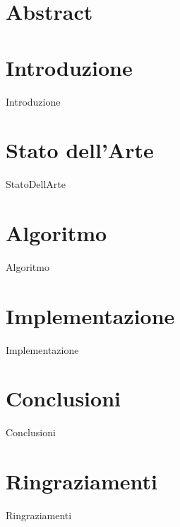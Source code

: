 \documentclass[12pt  m,oneside]{report}
\begin{document}
 
	                
	\begin{titlepage}
		
	\end{titlepage} 
    
    
	\chapter*{Abstract}
	
    \tableofcontents{}
    \listoftables
    \listoflistings
    \newpage
    \chapter{Introduzione}
    {Introduzione}
    \chapter{Stato dell'Arte}
    {StatoDellArte}
    \chapter{Algoritmo}
    {Algoritmo}
    \chapter{Implementazione}
    {Implementazione}
    \chapter{Conclusioni}
    {Conclusioni}
    \chapter{Ringraziamenti}
    {Ringraziamenti}
    
 
     
    
\end{document}
